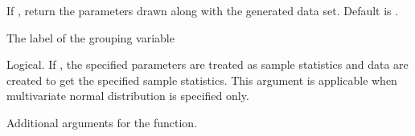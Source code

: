 \documentclass[a4paper]{book}
\begin{document}
\begin{Arguments}
\begin{ldescription}
\item[\code{params}]  
If , return the parameters drawn along with the generated data set. Default is .

\item[\code{group}]  
The label of the grouping variable

\item[\code{empirical}]  
Logical. If , the specified parameters are treated as sample statistics and data are created to get the specified sample statistics. This argument is applicable when multivariate normal distribution is specified only.

\item[\code{...}]  
Additional arguments for the  function. 

\end{ldescription}
\end{Arguments}
%
\end{document}
